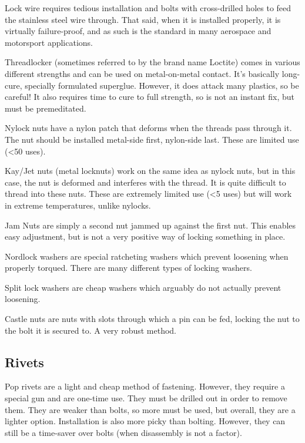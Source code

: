 \documentclass[10pt,letterpaper]{book}
\begin{document}
	\begin{asparaenum}[a)]
		\item Lock wire requires tedious installation and bolts with cross-drilled holes to feed the stainless steel wire through. That said, when it is installed properly, it is virtually failure-proof, and as such is the standard in many aerospace and motorsport applications. 
		\item Threadlocker (sometimes referred to by the brand name Loctite) comes in various different strengths and can be used on metal-on-metal contact. It's basically long-cure, specially formulated superglue. However, it does attack many plastics, so be careful! It also requires time to cure to full strength, so is not an instant fix, but must be premeditated.
		\item Nylock nuts have a nylon patch that deforms when the threads pass through it. The nut should be installed metal-side first, nylon-side last. These are limited use (<50 uses).
		\item Kay/Jet nuts (metal locknuts) work on the same idea as nylock nuts, but in this case, the nut is deformed and interferes with the thread. It is quite difficult to thread into these nuts. These are extremely limited use (<5 uses) but will work in extreme temperatures, unlike nylocks.
		\item Jam Nuts are simply a second nut jammed up against the first nut. This enables easy adjustment, but is not a very positive way of locking something in place.
		\item Nordlock washers are special ratcheting washers which prevent loosening when properly torqued. There are many different types of locking washers.
		\item Split lock washers are cheap washers which arguably do not actually prevent loosening.
		\item Castle nuts are nuts with slots through which a pin can be fed, locking the nut to the bolt it is secured to. A very robust method.
	\end{asparaenum}
	
	\subsection{Rivets}
	
	Pop rivets are a light and cheap method of fastening. However, they require a special gun and are one-time use. They must be drilled out in order to remove them. They are weaker than bolts, so more must be used, but overall, they are a lighter option. Installation is also more picky than bolting. However, they can still be a time-saver over bolts (when disassembly is not a factor).
	
\end{document}

